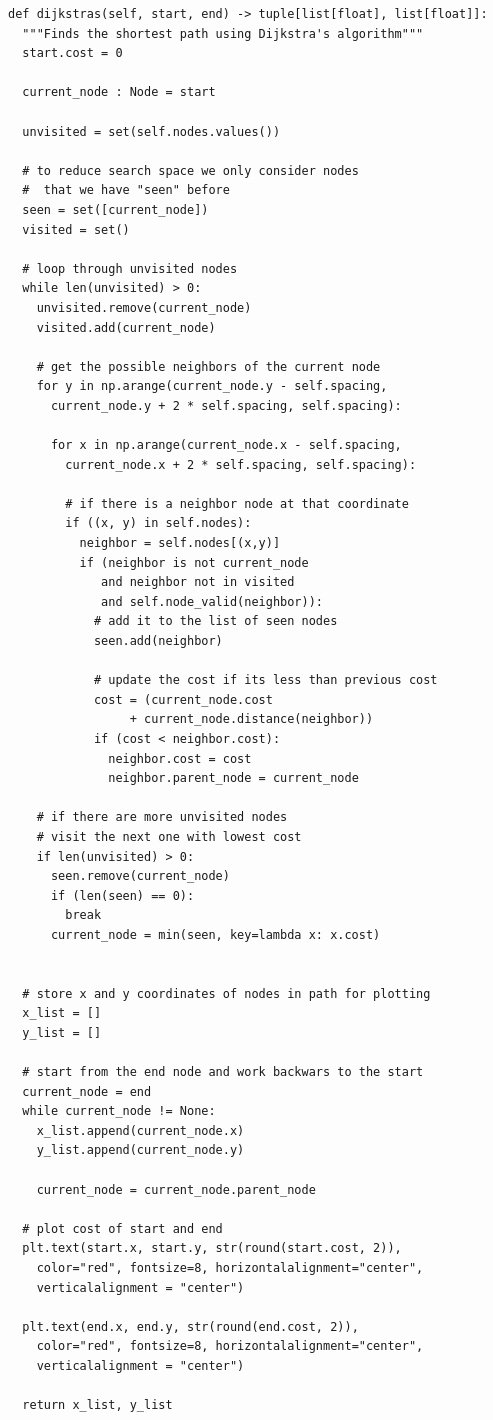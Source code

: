 \documentclass{article}
\begin{document}
\bigskip
\begin{mdframed}[backgroundcolor=bg]
\begin{verbatim}
def dijkstras(self, start, end) -> tuple[list[float], list[float]]:
  """Finds the shortest path using Dijkstra's algorithm"""
  start.cost = 0

  current_node : Node = start

  unvisited = set(self.nodes.values())

  # to reduce search space we only consider nodes
  #  that we have "seen" before
  seen = set([current_node])
  visited = set()

  # loop through unvisited nodes
  while len(unvisited) > 0:
    unvisited.remove(current_node)
    visited.add(current_node)
    
    # get the possible neighbors of the current node
    for y in np.arange(current_node.y - self.spacing, 
      current_node.y + 2 * self.spacing, self.spacing):

      for x in np.arange(current_node.x - self.spacing,
        current_node.x + 2 * self.spacing, self.spacing):

        # if there is a neighbor node at that coordinate
        if ((x, y) in self.nodes):
          neighbor = self.nodes[(x,y)]
          if (neighbor is not current_node
             and neighbor not in visited
             and self.node_valid(neighbor)):
            # add it to the list of seen nodes
            seen.add(neighbor)

            # update the cost if its less than previous cost
            cost = (current_node.cost
                 + current_node.distance(neighbor))
            if (cost < neighbor.cost):
              neighbor.cost = cost
              neighbor.parent_node = current_node
              
    # if there are more unvisited nodes
    # visit the next one with lowest cost
    if len(unvisited) > 0:
      seen.remove(current_node)
      if (len(seen) == 0):
        break
      current_node = min(seen, key=lambda x: x.cost)
    
  
  # store x and y coordinates of nodes in path for plotting
  x_list = []
  y_list = []

  # start from the end node and work backwars to the start
  current_node = end
  while current_node != None:
    x_list.append(current_node.x)
    y_list.append(current_node.y)

    current_node = current_node.parent_node
  
  # plot cost of start and end
  plt.text(start.x, start.y, str(round(start.cost, 2)), 
    color="red", fontsize=8, horizontalalignment="center", 
    verticalalignment = "center")

  plt.text(end.x, end.y, str(round(end.cost, 2)), 
    color="red", fontsize=8, horizontalalignment="center", 
    verticalalignment = "center")

  return x_list, y_list
\end{verbatim}  
\end{mdframed}
\end{document}
